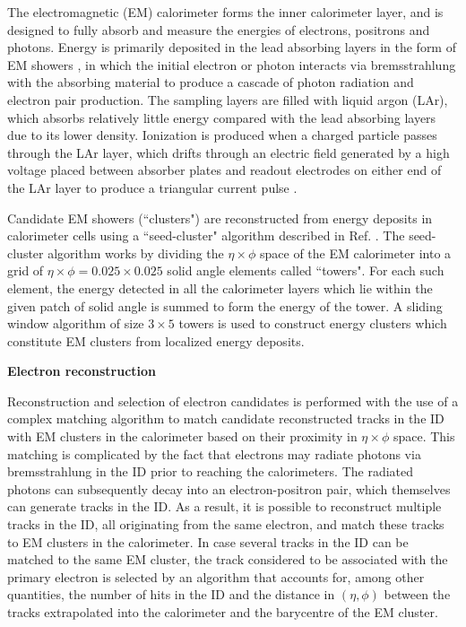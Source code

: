 The electromagnetic (EM) calorimeter forms the inner calorimeter layer, and is designed to fully absorb and measure the energies of electrons, positrons and photons. Energy is primarily deposited in the lead absorbing layers in the form of EM showers \cite{em_showers}, in which the initial electron or photon interacts via bremsstrahlung \cite{shower_theory} with the absorbing material to produce a cascade of photon radiation and electron pair production. The sampling layers are filled with liquid argon (LAr), which absorbs relatively little energy compared with the lead absorbing layers due to its lower density. Ionization is produced when a charged particle passes through the LAr \cite{em_cal} layer, which drifts through an electric field generated by a high voltage placed between absorber plates and readout electrodes on either end of the LAr layer to produce a triangular current pulse \cite{LAr_calo}. 

Candidate EM showers (``clusters") are reconstructed from energy deposits in calorimeter cells using a ``seed-cluster" algorithm described in Ref. \cite{electron_reco}. The seed-cluster algorithm works by dividing the $\eta\times\phi$ space of the EM calorimeter into a grid of $\eta\times\phi=0.025\times0.025$ solid angle elements called ``towers". For each such element, the energy detected in all the calorimeter layers which lie within the given patch of solid angle is summed to form the energy of the tower. A sliding window algorithm of size $3\times5$ towers is used to construct energy clusters which constitute EM clusters from localized energy deposits.

\textbf{Electron reconstruction}

Reconstruction and selection of electron candidates \cite{electron_reco} is performed with the use of a complex matching algorithm to match candidate reconstructed tracks in the ID with EM clusters in the calorimeter based on their proximity in $\eta\times\phi$ space. This matching is complicated by the fact that electrons may radiate photons via bremsstrahlung in the ID prior to reaching the calorimeters. The radiated photons can subsequently decay into an electron-positron pair, which themselves can generate tracks in the ID. As a result, it is possible to reconstruct multiple tracks in the ID, all originating from the same electron, and match these tracks to EM clusters in the calorimeter. In case several tracks in the ID can be matched to the same EM cluster, the track considered to be associated with the primary electron is selected by an algorithm that accounts for, among other quantities, the number of hits in the ID and the distance in $(\eta, \phi)$ between the tracks extrapolated into the calorimeter and the barycentre of the EM cluster. 


